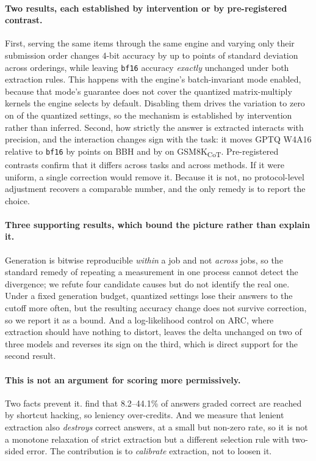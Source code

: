 \documentclass[11pt]{article}
\begin{document}
\paragraph{Two results, each established by intervention or by pre-registered contrast.}
First, serving the same items through the same engine and varying only their submission
order changes 4-bit accuracy by up to \hEightWorstSDTen{} points of standard deviation
across \hEightSDOrderings{} orderings, while leaving \texttt{bf16} accuracy \emph{exactly}
unchanged under both extraction rules. This happens with the engine's batch-invariant mode
enabled, because that mode's guarantee does not cover the quantized matrix-multiply kernels
the engine selects by default. Disabling them drives the variation to zero on
\hEightPinned{} of the quantized settings, so the mechanism is established by intervention
rather than inferred. Second, how strictly the answer is extracted interacts with
precision, and the interaction changes sign with the task: it moves GPTQ W4A16 relative to
\texttt{bf16} by \hThreeBbhGptqFour{} points on BBH and by \hThreeGsmGptqFour{} on
GSM8K\textsubscript{CoT}. Pre-registered contrasts confirm that it differs across tasks and
across methods. If it were uniform, a single correction would remove it. Because it is not,
no protocol-level adjustment recovers a comparable number, and the only remedy is to report
the choice.

\paragraph{Three supporting results, which bound the picture rather than explain it.}
Generation is bitwise reproducible \emph{within} a job and not \emph{across} jobs, so the
standard remedy of repeating a measurement in one process cannot detect the divergence; we
refute four candidate causes but do not identify the real one. Under a fixed generation
budget, quantized settings lose their answers to the cutoff more often, but the resulting
accuracy change does not survive correction, so we report it as a bound. And a
log-likelihood control on ARC, where extraction should have nothing to distort, leaves the
delta unchanged on two of three models and reverses its sign on the third, which is direct
support for the second result.

\paragraph{This is not an argument for scoring more permissively.}
Two facts prevent it. \citet{ren2026shortcut} find that 8.2--44.1\% of answers
graded correct are reached by shortcut hacking, so leniency over-credits. And we
measure that lenient extraction also \emph{destroys} correct answers, at a small
but non-zero rate, so it is not a monotone relaxation of strict extraction but a
different selection rule with two-sided error. The contribution is to
\emph{calibrate} extraction, not to loosen it.
\end{document}

